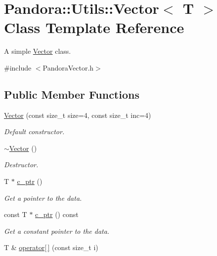 \hypertarget{classPandora_1_1Utils_1_1Vector}{
\section{Pandora::Utils::Vector$<$ T $>$ Class Template Reference}
\label{classPandora_1_1Utils_1_1Vector}
}


A simple \hyperlink{classPandora_1_1Utils_1_1Vector}{Vector} class.  


{\ttfamily \#include $<$PandoraVector.h$>$}\subsection*{Public Member Functions}
\begin{DoxyCompactItemize}
\item 
\hyperlink{classPandora_1_1Utils_1_1Vector_a08c4f102c57e56cabbca1c15e8c17122}{Vector} (const size\_\-t size=4, const size\_\-t inc=4)
\begin{DoxyCompactList}\small\item\em Default constructor. \item\end{DoxyCompactList}\item 
\hyperlink{classPandora_1_1Utils_1_1Vector_ab2688a6e46b857ad4756d21adadb0a20}{$\sim$Vector} ()
\begin{DoxyCompactList}\small\item\em Destructor. \item\end{DoxyCompactList}\item 
T $\ast$ \hyperlink{classPandora_1_1Utils_1_1Vector_a9760f625847909ad7dc45a71742bbcc9}{c\_\-ptr} ()
\begin{DoxyCompactList}\small\item\em Get a pointer to the data. \item\end{DoxyCompactList}\item 
const T $\ast$ \hyperlink{classPandora_1_1Utils_1_1Vector_a8ee2539ddb6b94eff47b6453143b2b83}{c\_\-ptr} () const 
\begin{DoxyCompactList}\small\item\em Get a constant pointer to the data. \item\end{DoxyCompactList}\item 
T \& \hyperlink{classPandora_1_1Utils_1_1Vector_adef2d8c160a9f9c2398f3c92f7874f4e}{operator\mbox{[}$\,$\mbox{]}} (const size\_\-t i)

\end{DoxyCompactItemize}
